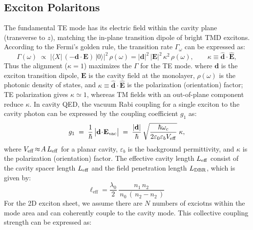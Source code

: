 \subsection{Exciton Polaritons}
The fundamental TE mode has its electric field within the cavity plane (transverse to $z$), matching the in-plane transition dipole of bright TMD excitons. 
According to the Fermi’s golden rule, the transition rate $\Gamma_{\omega}$ can be expressed as\cite{Fox2006-hp,Gerry2024-aa}:
\begin{equation}
\Gamma(\omega)\;\propto\; \big|\langle X|\,(-\mathbf{d}\!\cdot\!\mathbf{E})\,|0\rangle\big|^{2}\,\rho(\omega)
= \big|\mathbf{d}\big|^{2}\,\big|\mathbf{E}\big|^{2}\,\kappa^{2}\,\rho(\omega),
\qquad \kappa \equiv \hat{\mathbf{d}}\!\cdot\!\hat{\mathbf{E}},
\end{equation}
Thus the alignment ($\kappa\!=\!1$) maximizes the $\Gamma$ for the TE mode.
where $\mathbf d$ is the exciton transition dipole, $\mathbf E$ is the cavity field at the monolayer, $\rho(\omega)$ is the photonic density of states, and $\kappa\equiv \hat{\mathbf d}\!\cdot\!\hat{\mathbf E}$ is the polarization (orientation) factor; TE polarization gives $\kappa\simeq 1$, whereas TM fields with an out-of-plane component reduce $\kappa$.
In cavity QED, the vacuum Rabi coupling for a single exciton to the cavity photon can be expressed by the coupling coefficient $g_1$ as\cite{Fox2006-hp,Gerry2024-aa}:
\begin{equation}
g_1 \;=\; \frac{1}{\hbar}\,\big|\mathbf{d}\!\cdot\!\mathbf{E}_{\rm vac}\big|
\;=\; \frac{|\mathbf{d}|}{\hbar}\,\sqrt{\frac{\hbar\omega_c}{2\varepsilon_0 \varepsilon_b V_{\rm eff}}}\;\kappa,
\end{equation}
where $V_{\rm eff}\!\approx\!A\,L_{\rm eff}$ for a planar cavity, $\varepsilon_b$ is the background permittivity, and $\kappa$ is the polarization (orientation) factor. 
The effective cavity length $L_{\rm eff}$ consist of the cavity spacer length $L_{\rm eff}$ and the field penetration length $L_{\rm DBR}$, which is given by\cite{Rahimi-Iman2020-tt,Savona1995-vn}:
\begin{equation}
\ell_{\mathrm{eff}} = \frac{\lambda_0}{2}\,
\frac{n_{\mathrm{1}}\,n_{\mathrm{2}}}{\,n_0\,(\,n_{\mathrm{2}} - n_{\mathrm{2}}\,)} \, 
\end{equation}\vspace{-0.5em}
For the 2D exciton sheet, we assume there are $N$ numbers of exciotns within the mode area and can coherently couple to the cavity mode. 
This collective coupling strength can be expressed as:
